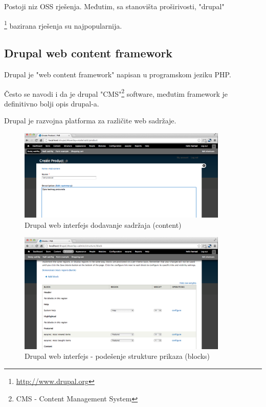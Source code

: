 \documentclass[times, utf8, seminar]{fit}
\begin{document}
Postoji niz OSS rješenja. Međutim, sa stanovišta proširivosti, "drupal"{\footnote{\url{http://www.drupal.org}} bazirana rješenja su najpopularnija.

\subsection{Drupal web content framework}

Drupal je "web content framework" napisan u programskom jeziku PHP. 

Često se navodi i da je drupal "CMS"{\footnote{CMS - Content Management System}} software, međutim framework je definitivno bolji opis drupal-a.

Drupal je razvojna platforma za različite web sadržaje.

\begin{figure}[H]
\centering
\includegraphics[width=10cm]{img/drupal_add_content.png}\hfill
\caption{Drupal web interfejs dodavanje sadržaja (content)}
\end{figure}

\begin{figure}[H]
\centering
\includegraphics[width=10cm]{img/drupal_block_structure.png}\hfill
\caption{Drupal web interfejs - podešenje strukture prikaza (blocks)}
\end{figure}



}
\end{document}
